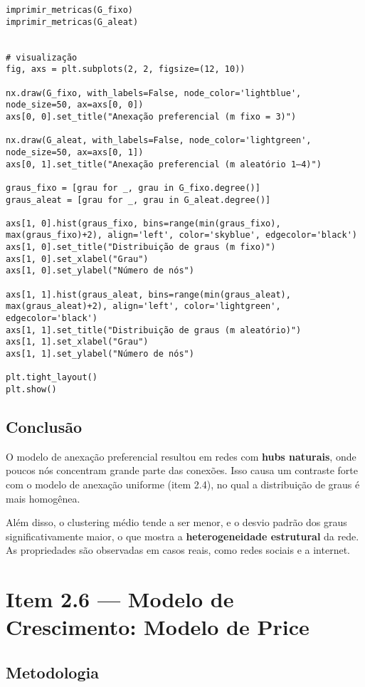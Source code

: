 \documentclass{article}
\begin{document}
\begin{verbatim}
imprimir_metricas(G_fixo)
imprimir_metricas(G_aleat)


# visualização
fig, axs = plt.subplots(2, 2, figsize=(12, 10))

nx.draw(G_fixo, with_labels=False, node_color='lightblue', node_size=50, ax=axs[0, 0])
axs[0, 0].set_title("Anexação preferencial (m fixo = 3)")

nx.draw(G_aleat, with_labels=False, node_color='lightgreen', node_size=50, ax=axs[0, 1])
axs[0, 1].set_title("Anexação preferencial (m aleatório 1–4)")

graus_fixo = [grau for _, grau in G_fixo.degree()]
graus_aleat = [grau for _, grau in G_aleat.degree()]

axs[1, 0].hist(graus_fixo, bins=range(min(graus_fixo), max(graus_fixo)+2), align='left', color='skyblue', edgecolor='black')
axs[1, 0].set_title("Distribuição de graus (m fixo)")
axs[1, 0].set_xlabel("Grau")
axs[1, 0].set_ylabel("Número de nós")

axs[1, 1].hist(graus_aleat, bins=range(min(graus_aleat), max(graus_aleat)+2), align='left', color='lightgreen', edgecolor='black')
axs[1, 1].set_title("Distribuição de graus (m aleatório)")
axs[1, 1].set_xlabel("Grau")
axs[1, 1].set_ylabel("Número de nós")

plt.tight_layout()
plt.show()
\end{verbatim}

\subsection*{Conclusão}

O modelo de anexação preferencial resultou em redes com \textbf{hubs naturais}, onde poucos nós concentram grande parte das conexões. Isso causa um contraste forte com o modelo de anexação uniforme (item 2.4), no qual a distribuição de graus é mais homogênea.

Além disso, o clustering médio tende a ser menor, e o desvio padrão dos graus significativamente maior, o que mostra a \textbf{heterogeneidade estrutural} da rede. As propriedades são observadas em casos reais, como redes sociais  e a internet.

\newpage

\section*{Item 2.6 — Modelo de Crescimento: Modelo de Price}

\subsection*{Metodologia}
\end{document}
